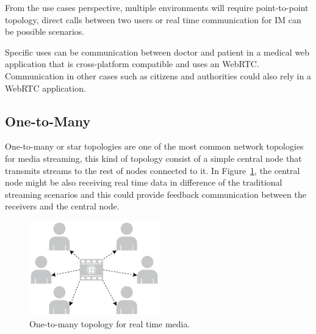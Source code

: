 From the use cases perspective, multiple environments will require point-to-point topology, direct calls between two users or real time communication for IM can be possible scenarios.

Specific uses can be communication between doctor and patient in a medical web application that is cross-platform compatible and uses an WebRTC. Communication in other cases such as citizens and authorities could also rely in a WebRTC application.
 
%
%

\subsection{One-to-Many}

One-to-many or star topologies are one of the most common network topologies for media streaming, this kind of topology consist of a simple central node that transmits streams to the rest of nodes connected to it. In Figure~\ref{fig:starExample}, the central node might be also receiving real time data in difference of the traditional streaming scenarios and this could provide feedback communication between the receivers and the central node.

 \begin{figure}[h]
  \centering
    \includegraphics[width=0.5\textwidth]{./figures/star.pdf}
      \caption[One-to-many topology for real time media]{One-to-many topology for real time media.}
	\label{fig:starExample}
\end{figure}

